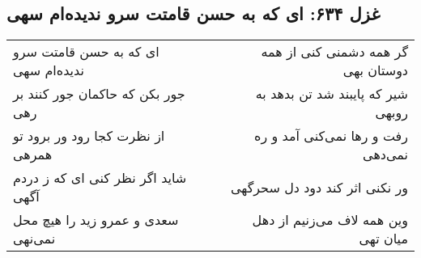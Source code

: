 \begin{center}
\section*{غزل ۶۳۴: ای که به حسن قامتت سرو ندیده‌ام سهی}
\label{sec:634}
\begin{longtable}{l p{0.5cm} r}
ای که به حسن قامتت سرو ندیده‌ام سهی
&&
گر همه دشمنی کنی از همه دوستان بهی
\\
جور بکن که حاکمان جور کنند بر رهی
&&
شیر که پایبند شد تن بدهد به روبهی
\\
از نظرت کجا رود ور برود تو همرهی
&&
رفت و رها نمی‌کنی آمد و ره نمی‌دهی
\\
شاید اگر نظر کنی ای که ز دردم آگهی
&&
ور نکنی اثر کند دود دل سحرگهی
\\
سعدی و عمرو زید را هیچ محل نمی‌نهی
&&
وین همه لاف می‌زنیم از دهل میان تهی
\\
\end{longtable}
\end{center}
